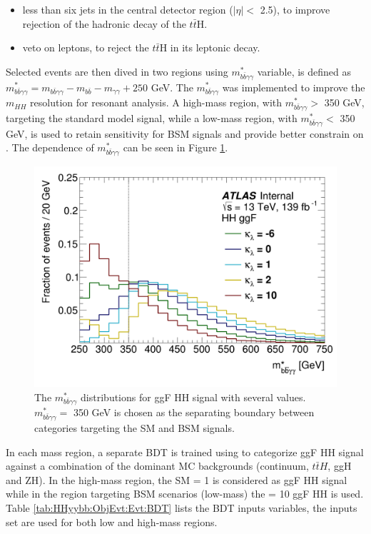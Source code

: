 \begin{itemize}
    \protect
    \item less than six jets in the central detector region ($|\eta| < $ 2.5), to improve rejection of the hadronic decay of the $t\bar{t}$H. 
    \item veto on leptons, to reject the $t\bar{t}$H in its leptonic decay.  
\end{itemize}

Selected events are then dived in two regions using $m_{b\bar{b}\gamma\gamma}^*$ variable, is defined as  $m_{b\bar{b}\gamma\gamma}^* = m_{b\bar{b}\gamma\gamma} - m_{b\bar{b}} - m_{\gamma\gamma} + 250$ GeV. The $m_{b\bar{b}\gamma\gamma}^*$ was implemented to improve the $m_{HH}$ resolution for resonant analysis. A high-mass region, with $m_{b\bar{b}\gamma\gamma}^* > $ 350 GeV, targeting the standard model signal, while a low-mass region, with $m_{b\bar{b}\gamma\gamma}^* < $ 350 GeV, is used to retain sensitivity for BSM signals and provide better constrain on \kl. The dependence of $m_{b\bar{b}\gamma\gamma}^*$ can be seen in Figure \ref{fig:HHyybb:ObjEvt:Evt:myybb}.  
\begin{figure}[htbp]
    \centering
	\includegraphics[width=.6\textwidth]{Ch5/Img/yybbstar_ggF.png} 
    \caption{The $m_{b\bar{b}\gamma\gamma}^*$ distributions for ggF HH signal with several \kl values. $m_{b\bar{b}\gamma\gamma}^* = $ 350 GeV is chosen as the separating boundary between categories targeting the SM and BSM \kl signals.}
    \label{fig:HHyybb:ObjEvt:Evt:myybb}
\end{figure}

In each mass region, a separate BDT is trained using \cite{XGBoost} to categorize ggF HH signal against a combination of the dominant MC backgrounds (continuum, $t\bar{t}H$, ggH and ZH). In the high-mass region, the SM \kl= 1 is considered as ggF HH signal while in the region targeting BSM scenarios (low-mass) the \kl= 10 ggF HH is used. Table \ref{tab:HHyybb:ObjEvt:Evt:BDT} lists the BDT inputs variables, the inputs set are used for both low and high-mass regions.

